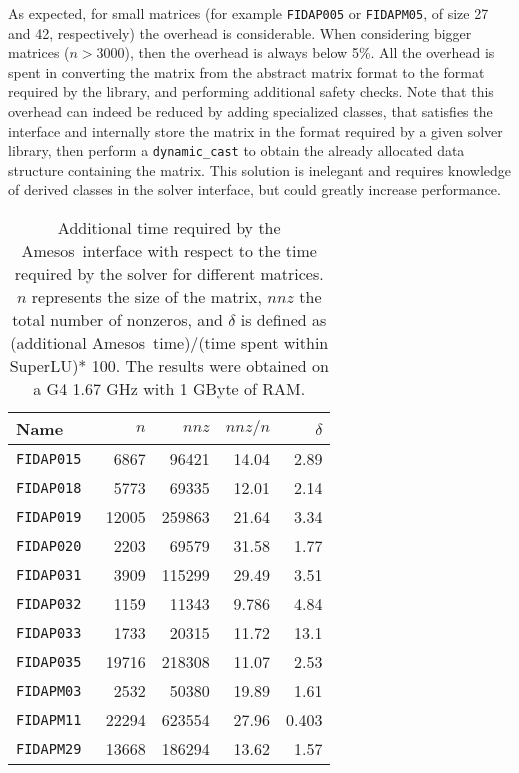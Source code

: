 \documentclass{llncs}
\newcommand{\amesos}{{\sc Amesos}}
\begin{document}
As expected, for small matrices (for example \verb!FIDAP005! or
\verb!FIDAPM05!, of size 27 and 42, respectively) the overhead is
considerable. When considering bigger matrices ($n > 3000$), then the overhead
is  always below 5\%. All the overhead is spent in converting the matrix from
the abstract matrix format to the format required by the
library, and performing additional safety checks.  Note that this overhead can
indeed be reduced by adding specialized classes, that satisfies the
interface and internally store the matrix in the format required
by a given solver library, then 
perform a {\tt dynamic\_cast} to obtain the already allocated data
structure containing the matrix. This solution is inelegant and requires
knowledge of derived classes in the solver interface, but could greatly
increase performance. 

\begin{table}
\begin{center}
\begin{tabular}{p{5cm} r r r r}
\hline
Name  & $n$   & $nnz$  & $nnz / n$  & $\delta$ \\
\hline
\tt FIDAP015 & 6867  & 96421  & 14.04 &  2.89  \\
\tt FIDAP018 & 5773  & 69335  & 12.01 &  2.14  \\
\tt FIDAP019 & 12005 & 259863 & 21.64 &  3.34  \\
\tt FIDAP020 & 2203  & 69579  & 31.58 &  1.77  \\
\tt FIDAP031 & 3909  & 115299 & 29.49 &  3.51  \\
\tt FIDAP032 & 1159  & 11343  & 9.786 &  4.84  \\
\tt FIDAP033 & 1733  & 20315  & 11.72 &  13.1   \\
\tt FIDAP035 & 19716 & 218308 & 11.07 &  2.53  \\
\tt FIDAPM03 & 2532  & 50380  & 19.89 &  1.61  \\
\tt FIDAPM11 & 22294 & 623554 & 27.96 &  0.403 \\
\tt FIDAPM29 & 13668 & 186294 & 13.62 &  1.57  \\
\hline
\end{tabular}
\caption{Additional time required by the \amesos\ interface with respect to the
time required by the solver for different matrices. $n$
  represents the size of the matrix, $nnz$ the total number of nonzeros, and
$\delta$ is defined as (additional \amesos\ time)/(time spent within
SuperLU)* 100.
The results were obtained on a G4 1.67 GHz with 1 GByte of RAM.}
\label{fig:results}

\end{center}
\end{table}
\end{document}
